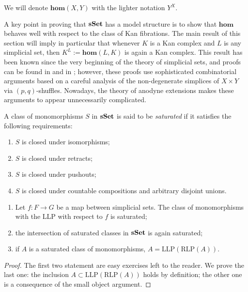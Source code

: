 \begin{refsection}
\begin{notation}
We will denote $\mathbf{hom}(X,Y)$ with the lighter notation $Y^X$.
\end{notation}

A key point in proving that $\mathbf{sSet}$ has a model structure is to show that $\mathbf{hom}$ behaves well with respect to the class of Kan fibrations. The main result of this section will imply in particular that whenever $K$ is a Kan complex and $L$ is any simplicial set, then $K^L := \mathbf{hom}(L,K)$ is again a Kan complex. This result has been known since the very beginning of the theory of simplicial sets, and proofs can be found in \cite{gz} and in \cite{may}; however, these proofs use sophisticated combinatorial arguments based on a careful analysis of the non-degenerate simplices of $X \times Y$ via $(p,q)$-shuffles. Nowadays, the theory of anodyne extensions makes these arguments to appear unnecessarily complicated.

\begin{defin}
A class of monomorphisms $S$ in $\mathbf{sSet}$ is said to be \emph{saturated} if it satisfies the following requirements:
\begin{enumerate}
\item $S$ is closed under isomorphisms;
\item $S$ is closed under retracts;
\item $S$ is closed under pushouts;
\item $S$ is closed under countable compositions and arbitrary disjoint unions.
\end{enumerate}
\end{defin}

\begin{lemma} \label{lemma llp saturation}
\begin{enumerate}
\item Let $f \colon F \to G$ be a map between simplicial sets. The class of monomorphisms with the LLP with respect to $f$ is saturated;

\item the intersection of saturated classes in $\mathbf{sSet}$ is again saturated;

\item if $A$ is a saturated class of monomorphisms, $A = \mathrm{LLP}(\mathrm{RLP}(A))$.
\end{enumerate}
\end{lemma}

\begin{proof}
The first two statement are easy exercises left to the reader. We prove the last one: the inclusion $A \subset \mathrm{LLP}(\mathrm{RLP}(A))$ holds by definition; the other one is a consequence of the small object argument.
\end{proof}


\end{refsection}
